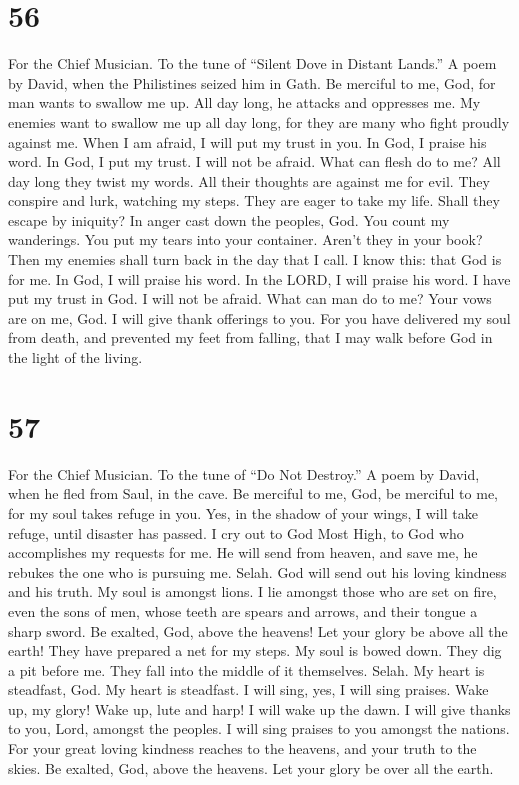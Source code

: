 \hypertarget{section-55}{%
\section{56}\label{section-55}}

For the Chief Musician. To the tune of ``Silent Dove in Distant Lands.''
A poem by David, when the Philistines seized him in Gath. 
Be merciful to me, God, for man wants to swallow me up. All day long, he
attacks and oppresses me.  My enemies want to swallow me up
all day long, for they are many who fight proudly against me.
 When I am afraid, I will put my trust in you. 
In God, I praise his word. In God, I put my trust. I will not be afraid.
What can flesh do to me?  All day long they twist my words.
All their thoughts are against me for evil.  They conspire
and lurk, watching my steps. They are eager to take my life.
 Shall they escape by iniquity? In anger cast down the
peoples, God.  You count my wanderings. You put my tears
into your container. Aren't they in your book?  Then my
enemies shall turn back in the day that I call. I know this: that God is
for me.  In God, I will praise his word. In the LORD, I
will praise his word.  I have put my trust in God. I will
not be afraid. What can man do to me?  Your vows are on me,
God. I will give thank offerings to you.  For you have
delivered my soul from death, and prevented my feet from falling, that I
may walk before God in the light of the living.

\hypertarget{section-56}{%
\section{57}\label{section-56}}

For the Chief Musician. To the tune of ``Do Not Destroy.'' A poem by
David, when he fled from Saul, in the cave.  Be merciful to
me, God, be merciful to me, for my soul takes refuge in you. Yes, in the
shadow of your wings, I will take refuge, until disaster has passed.
 I cry out to God Most High, to God who accomplishes my
requests for me.  He will send from heaven, and save me, he
rebukes the one who is pursuing me. Selah. God will send out his loving
kindness and his truth.  My soul is amongst lions. I lie
amongst those who are set on fire, even the sons of men, whose teeth are
spears and arrows, and their tongue a sharp sword.  Be
exalted, God, above the heavens! Let your glory be above all the earth!
 They have prepared a net for my steps. My soul is bowed
down. They dig a pit before me. They fall into the middle of it
themselves. Selah.  My heart is steadfast, God. My heart is
steadfast. I will sing, yes, I will sing praises.  Wake up,
my glory! Wake up, lute and harp! I will wake up the dawn. 
I will give thanks to you, Lord, amongst the peoples. I will sing
praises to you amongst the nations.  For your great loving
kindness reaches to the heavens, and your truth to the skies.
 Be exalted, God, above the heavens. Let your glory be over
all the earth.

